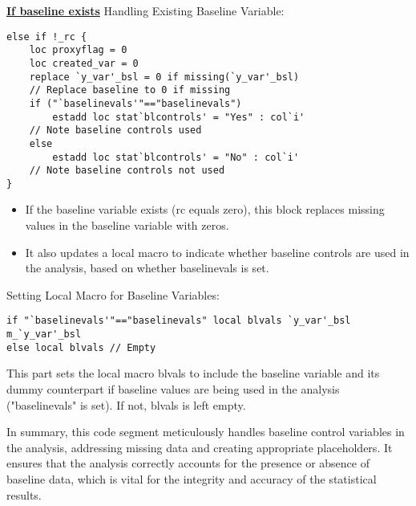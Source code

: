\documentclass{article}
\begin{document}
\underline{\textbf{If baseline exists}}
\vspace{0.3cm}Handling Existing Baseline Variable:
\begin{mdframed}
\begin{verbatim}
else if !_rc {
    loc proxyflag = 0 
    loc created_var = 0
    replace `y_var'_bsl = 0 if missing(`y_var'_bsl) 
    // Replace baseline to 0 if missing
    if ("`baselinevals'"=="baselinevals") 
        estadd loc stat`blcontrols' = "Yes" : col`i' 
    // Note baseline controls used 
    else 
        estadd loc stat`blcontrols' = "No" : col`i' 
    // Note baseline controls not used 
}
\end{verbatim}
\end{mdframed}

\begin{itemize}
    \item If the baseline variable exists (rc equals zero), this block replaces missing values in the baseline variable with zeros.
    \item It also updates a local macro to indicate whether baseline controls are used in the analysis, based on whether baselinevals is set.
\end{itemize}

\vspace{0.3cm}Setting Local Macro for Baseline Variables:
\begin{mdframed}
\begin{verbatim}
if "`baselinevals'"=="baselinevals" local blvals `y_var'_bsl m_`y_var'_bsl 
else local blvals // Empty
\end{verbatim}
\end{mdframed}

\vspace{0.3cm}This part sets the local macro blvals to include the baseline variable and its dummy counterpart if baseline values are being used in the analysis ("baselinevals" is set). If not, blvals is left empty.\newline

In summary, this code segment meticulously handles baseline control variables in the analysis, addressing missing data and creating appropriate placeholders. It ensures that the analysis correctly accounts for the presence or absence of baseline data, which is vital for the integrity and accuracy of the statistical results.
\end{document}

